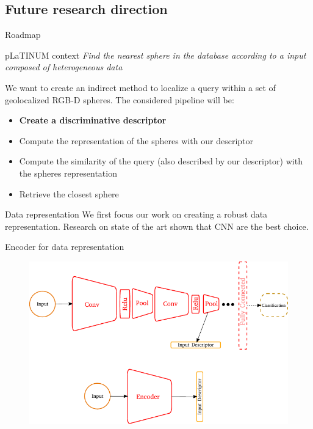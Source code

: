\subsection{Future research direction}

\label{sec:intro}

\begin{frame}{Roadmap}
	\begin{block}{pLaTINUM context}
		\textit{Find the nearest sphere in the database according to a input composed of heterogeneous data}
	\end{block}
	
	We want to create an indirect method to localize a query within a set of geolocalized RGB-D spheres. The considered pipeline will be:
	\begin{itemize}
		\item \textbf<2>{Create a discriminative descriptor}
		\item Compute the representation of the spheres with our descriptor
		\item Compute the similarity of the query (also described by our descriptor) with the spheres representation
		\item Retrieve the closest sphere
	\end{itemize}
\end{frame}

\begin{frame}{Data representation}
	We first focus our work on creating a robust data representation. Research on state of the art shown that CNN are the best choice.
	
	\begin{block}{Encoder for data representation}
		\begin{figure}[c]
			\includegraphics[width=0.75\linewidth]{vect/encodeur.pdf}					
		\end{figure}
	\end{block}
	
\end{frame}

